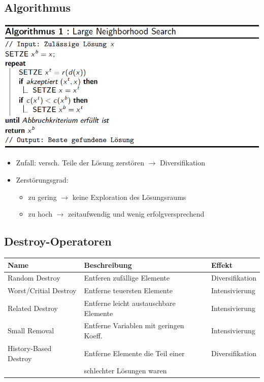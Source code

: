 \documentclass[12pt]{article}
\begin{document}
		\subsection{Algorithmus}
			\includegraphics[scale=0.6]{LNS}
			\begin{itemize}
				\item Zufall: versch. Teile der Lösung zerstören $\rightarrow$ Diversifikation
				\item Zerstörungsgrad:
					\begin{itemize}
						\item zu gering $\rightarrow$ keine Exploration des Lösungsraums
						\item zu hoch $\rightarrow$ zeitaufwendig und wenig erfolgversprechend
					\end{itemize}
			\end{itemize}
		\subsection{Destroy-Operatoren}
			\begin{tabular}{l l l}
				Name & Beschreibung & Effekt \\ \hline
				Random Destroy & Entferen zufällige Elemente & Diversifikation \\
				Worst/Critial Destroy & Entferne teuersten Elemente & Intensivierung \\
				Related Destroy & Entferne leicht austauschbare Elemente & Intensivierung \\
				Small Removal & Entferne Variablen mit geringen Koeff. & Intensivierung \\
				History-Based Destroy & Entferne Elemente die Teil einer & Diversifikation\\
				& schlechter Lösungen waren & 				
			\end{tabular}
\end{document}
